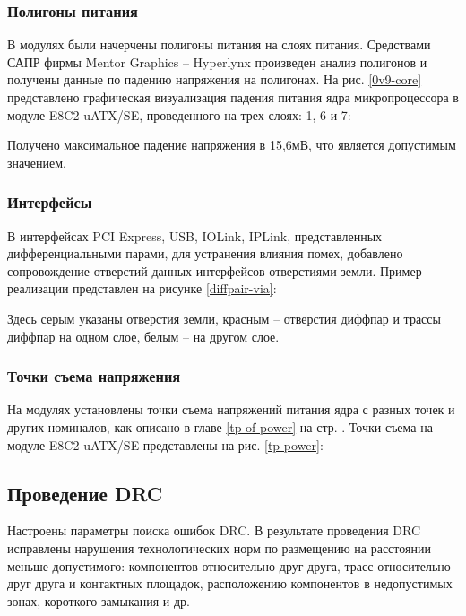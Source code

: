 \subsubsection{Полигоны питания}

В модулях были начерчены полигоны питания на слоях питания. Средствами САПР фирмы Mentor Graphics -- Hyperlynx произведен анализ полигонов и получены данные по падению напряжения на полигонах. На рис. \ref{0v9-core} представлено графическая визуализация падения питания ядра микропроцессора в модуле E8C2-uATX/SE, проведенного на трех слоях: 1, 6 и 7:

Получено максимальное падение напряжения в 15,6мВ, что является допустимым значением.

\subsubsection{Интерфейсы}

В интерфейсах PCI Express, USB, IOLink, IPLink, представленных дифференциальными парами, для устранения влияния помех, добавлено сопровождение отверстий данных интерфейсов отверстиями земли. Пример реализации представлен на рисунке \ref{diffpair-via}:


Здесь серым указаны отверстия земли, красным -- отверстия диффпар и трассы диффпар на одном слое, белым -- на другом слое.

\subsubsection{Точки съема напряжения}

На модулях установлены точки съема напряжений питания ядра с разных точек и других номиналов, как описано в главе \ref{tp-of-power} на стр. \pageref{tp-of-power}. Точки съема на модуле E8C2-uATX/SE представлены на рис. \ref{tp-power}:


\subsection{Проведение DRC}

Настроены параметры поиска ошибок DRC. В результате проведения DRC исправлены нарушения технологических норм по размещению на расстоянии меньше допустимого: компонентов относительно друг друга, трасс относительно друг друга и контактных площадок, расположению компонентов в недопустимых зонах, короткого замыкания и др.

